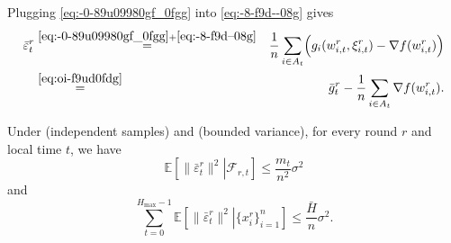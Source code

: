 \documentclass{article}
\newcommand{\cF}{\mathcal{F}}
\newcommand{\ExpCond}[2]{{\mathbb{E}}\left[\left.#1\right\vert#2\right]}
\theoremstyle{plain}
\theoremstyle{definition}
\begin{document}
Plugging  \eqref{eq:-0-89u09980gf_0fgg} into \eqref{eq:-8-f9d--08g}  gives
\begin{eqnarray}
\bar\varepsilon_t^r
&\overset{\eqref{eq:-0-89u09980gf_0fgg}+\eqref{eq:-8-f9d--08g}}{=}&
\frac{1}{n}\sum_{i\in A_t}\Bigl(g_i(w_{i,t}^r,\xi_{i,t}^r)-\nabla f(w_{i,t}^r)\Bigr) \notag \\
& \overset{\eqref{eq:oi-f9ud0fdg}}{=} &
\bar g_t^r-\frac{1}{n}\sum_{i\in A_t}\nabla f(w_{i,t}^r). \notag
\end{eqnarray}

\begin{lemma}
\label{lem:variance_reduction}Under  (independent samples) and  (bounded variance), for every round \(r\) and local time \(t\), we have
\[
\ExpCond{\|\bar\varepsilon_t^r\|^2}{\cF_{r,t}}
\le
\frac{m_t}{n^2}\sigma^2
\]
and
\[
\sum_{t=0}^{H_{\max}-1}
\ExpCond{\|\bar\varepsilon_t^r\|^2}{\{x_i^r\}_{i=1}^n}
\le
\frac{\bar H}{n}\sigma^2.
\]
\end{lemma}
\end{document}
